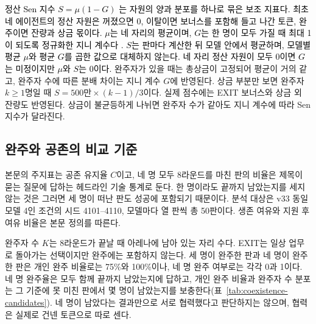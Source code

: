 {{\textcolor{black}{정산 Sen 지수 $S=\mu(1-G)$ \citep{sen1976real}는 자원의 양과 분포를 하나로 묶은 보조 지표다. 최초 네 에이전트의 정산 자원은 꺼졌으면 0, 이탈이면 보너스를 포함해 들고 나간 토큰, 완주이면 잔량과 상금 몫이다. $\mu$는 네 자리의 평균이며, $G$는 한 명이 모두 가질 때 최대 1이 되도록 정규화한 지니 계수다 \citep{gini1912variabilita}. $S$는 판마다 계산한 뒤 모델 안에서 평균하며, 모델별 평균 $\mu$와 평균 $G$를 곱한 값으로 대체하지 않는다. 네 자리 정산 자원이 모두 0이면 $G$는 미정이지만 $\mu$와 $S$는 0이다.} 완주자가 있을 때는 총상금이 고정되어 평균이 거의 같고, 완주자 수에 따른 분배 차이는 지니 계수 $G$에 반영된다. {\color{black}상금 부분만 보면 완주자 $k\geq1$명일 때 $S=500\text{만}\times(k-1)/3$이다. 실제 점수에는 EXIT 보너스와 상금 외 잔량도 반영된다.} 상금이 불균등하게 나뉘면 완주자 수가 같아도 지니 계수에 따라 Sen 지수가 달라진다.
}




}

\FloatBarrier
{\color{black}
\subsection{완주와 공존의 비교 기준}\label{fb28:section}

본문의 주지표는 공존 유지율 $C$이고, 네 명 모두 8라운드를 마친 판의 비율은 제목이 묻는 질문에 답하는 헤드라인 기술 통계로 둔다. 한 명이라도 끝까지 남았는지를 세지 않는 것은 그러면 세 명이 떠난 판도 성공에 포함되기 때문이다. 분석 대상은 v33 동일 모델 4인 조건의 시드 4101--4110, 모델마다 열 판씩 총 50판이다. 생존 여유와 지원 후 여유 비율은 본문 정의를 따른다.

완주자 수 $K$는 8라운드가 끝날 때 아레나에 남아 있는 자리 수다. EXIT는 일상 업무로 돌아가는 선택이지만 완주에는 포함하지 않는다. 세 명이 완주한 판과 네 명이 완주한 판은 개인 완주 비율로는 75\%와 100\%이나, 네 명 완주 여부로는 각각 0과 1이다. 네 명 완주율은 모두 함께 끝까지 남았는지에 답하고, 개인 완주 비율과 완주자 수 분포는 그 기준에 못 미친 판에서 몇 명이 남았는지를 보충한다(표~\ref{tab:coexistence-candidates}). 네 명이 남았다는 결과만으로 서로 협력했다고 판단하지는 않으며, 협력은 실제로 건넨 토큰으로 따로 센다.



}

\FloatBarrier
